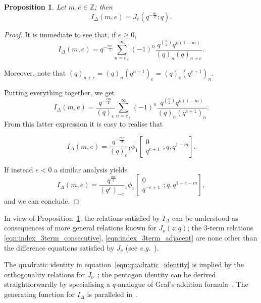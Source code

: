 \documentclass[11pt]{amsart}
\newtheorem{prop}[thm]{Proposition}
\newcommand{\Z}{\mathbb{Z}}
\newcommand{\tet}{I_{\Delta}}
\begin{document}
\begin{prop}\label{prop:equivalence}
Let $m,e \in \Z$; then
$$\tet \left(m,e\right) = J_e \left(q^{-\frac{m}{2}};q\right).$$
\end{prop}
\begin{proof}
It is immediate to see that, if $e \ge 0$,
$$I_\Delta \left(m,e\right) = q^{-\frac{em}{2}}\sum_{n = e_+}^\infty \left(-1\right)^n \frac{q^{\binom{n}{2}} q^{n\left(1-m\right)}}{\left(q\right)_n \left(q\right)_{n+e}}. $$

Moreover, note that $\left(q\right)_{n+e} = \left(q\right)_n \left(q^{n+1}\right)_e = \left(q\right)_{e} \left(q^{e+1}\right)_n$.

Putting everything together, we get
$$I_\Delta \left(m,e\right) = \frac{q^{-\frac{em}{2}}}{\left(q\right)_e}\sum_{n = e_+}^\infty \left(-1\right)^n \frac{q^{\binom{n}{2}} q^{n\left(1-m\right)}}{\left(q\right)_n \left(q^{e+1}\right)_{n}}.$$
From this latter expression it is easy to realise that

\begin{equation}\label{eqn:index_qhyper_positive}
I_\Delta \left(m,e\right) = \frac{q^{-\frac{me}{2}}}{\left(q\right)_e} {_1 \phi_1}\left[\begin{matrix} 0  \\ q^{e+1}  \end{matrix} ; q,q^{1-m} \right].
\end{equation}

If instead $e<0$ a similar analysis yields
\begin{equation}\label{eqn:index_qhyper_negative}
I_\Delta \left(m,e\right) = \frac{q^{\frac{me}{2}}}{\left(q^e\right)_{-e}} {_1 \phi_1}\left[\begin{matrix} 0  \\ q^{-e+1}  \end{matrix} ; q,q^{1-e-m} \right],
\end{equation}
and we can conclude.
\end{proof}


In view of Proposition~\ref{prop:equivalence}, the relations satisfied by $\tet$ can be understood as consequences of more general relations known for $J_\nu\left(z;q\right)$; the $3$-term relations \eqref{eqn:index_3term_consecutive}, \eqref{eqn:index_3term_adjacent} are none other than the difference equations satisfied by $J_\nu$ (see \emph{e.g.}~\cite[4.3.1]{SwarttouwPhD}).


The quadratic identity in equation~\eqref{eqn:quadratic_identity} is implied by the orthogonality relations for $J_\nu$~\cite[Thm.~3.8]{SwarttouwPhD}; the pentagon identity can be derived straightforwardly by specialising a $q$-analogue of Graf's addition formula~\cite{koelink1995q}. The generating function for $\tet$ is paralleled in~\cite[Prop.~2.5]{koornwinder1992}.
\end{document}
